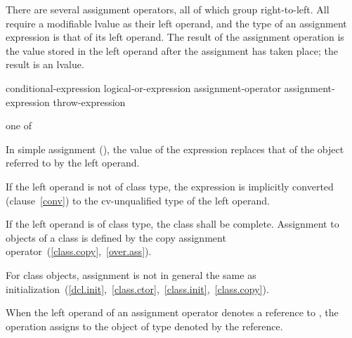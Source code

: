 \pnum
{}%
%
%
%
%
%
%
%
%
%
%
%
There are several assignment operators, all of which group right-to-left.
%
All require a modifiable lvalue as their left operand, and the type
of an assignment expression is that of its left operand. The result
of the assignment operation is the value stored in the left operand
after the assignment has taken place; the result is an lvalue.

\begin{bnf}
\br
    conditional-expression\br
    logical-or-expression assignment-operator assignment-expression\br
    throw-expression
\end{bnf}

\begin{bnf}
 \textnormal{one of}\br
    \terminal{=  *=  /=  \%=   +=  -=  \shr=  \shl=  \&=  \^{}=  |=}
\end{bnf}

\pnum
In simple assignment (\tcode{=}), the value of the expression replaces
that of the object referred to by the left operand.

\pnum
{}%
If the left operand is not of class type, the expression is implicitly
converted (clause~\ref{conv}) to the cv-unqualified type of the left
operand.

\pnum
{}%
%
If the left operand is of class type, the class shall be complete.
Assignment to objects of a class is defined by the copy assignment
operator~(\ref{class.copy},~\ref{over.ass}).

\pnum
\enternote 
For class objects, assignment is not in general the same as
initialization~(\ref{dcl.init},~\ref{class.ctor},~\ref{class.init},~\ref{class.copy}).
\exitnote 

\pnum
{}%
When the left operand of an assignment operator denotes a reference to
, the operation assigns to the object of type  denoted
by the reference.

